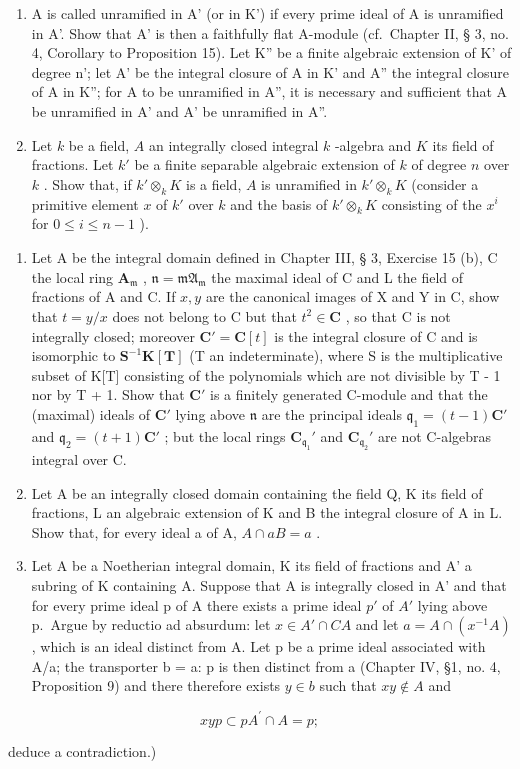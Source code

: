 \begin{enumerate}
\def\labelenumi{(\alph{enumi})}
\setcounter{enumi}{2}
\item
  A is called unramified in A' (or in K') if every prime ideal of A is unramified in A'. Show that A' is then a faithfully flat A-module (cf.~Chapter II, § 3, no. 4, Corollary to Proposition 15). Let K'' be a finite algebraic extension of K' of degree n'; let A' be the integral closure of A in K' and A'' the integral closure of A in K''; for A to be unramified in A'', it is necessary and sufficient that A be unramified in A' and A' be unramified in A''.
\item
  Let \(k\) be a field, \(A\) an integrally closed integral \(k\) -algebra and \(K\) its field of fractions. Let \(k'\) be a finite separable algebraic extension of \(k\) of degree \(n\) over \(k\) . Show that, if \(k' \otimes_k K\) is a field, \(A\) is unramified in \(k' \otimes_k K\) (consider a primitive element \(x\) of \(k'\) over \(k\) and the basis of \(k' \otimes_k K\) consisting of the \(x^i\) for \(0 \leqslant i \leqslant n - 1\) ).
\end{enumerate}

\begin{enumerate}
\def\labelenumi{\arabic{enumi}.}
\setcounter{enumi}{19}
\item
  Let A be the integral domain defined in Chapter III, § 3, Exercise 15 (b), C the local ring \(\mathbf{A}_{\mathfrak{m}}\) , \(\mathfrak{n} = \mathfrak{mA}_{\mathfrak{m}}\) the maximal ideal of C and L the field of fractions of A and C. If \(x, y\) are the canonical images of X and Y in C, show that \(t = y / x\) does not belong to C but that \(t^2 \in \mathbf{C}\) , so that C is not integrally closed; moreover \(\mathbf{C}' = \mathbf{C}[t]\) is the integral closure of C and is isomorphic to \(\mathbf{S}^{-1}\mathbf{K}[\mathbf{T}]\) (T an indeterminate), where S is the multiplicative subset of K{[}T{]} consisting of the polynomials which are not divisible by T - 1 nor by T + 1. Show that \(\mathbf{C}'\) is a finitely generated C-module and that the (maximal) ideals of \(\mathbf{C}'\) lying above \(\mathfrak{n}\) are the principal ideals \(\mathfrak{q}_1 = (t - 1)\mathbf{C}'\) and \(\mathfrak{q}_2 = (t + 1)\mathbf{C}'\) ; but the local rings \(\mathbf{C}_{\mathfrak{q}_1}'\) and \(\mathbf{C}_{\mathfrak{q}_2}'\) are not C-algebras integral over C.
\item
  Let A be an integrally closed domain containing the field Q, K its field of fractions, L an algebraic extension of K and B the integral closure of A in L. Show that, for every ideal a of A, \(A \cap aB = a\) .
\item
  Let A be a Noetherian integral domain, K its field of fractions and A' a subring of K containing A. Suppose that A is integrally closed in A' and that for every prime ideal p of A there exists a prime ideal \(p'\) of \(A'\) lying above p.~Argue by reductio ad absurdum: let \(x \in A' \cap C A\) and let \(a = A \cap (x^{-1} A)\) , which is an ideal distinct from A. Let p be a prime ideal associated with A/a; the transporter b = a: p is then distinct from a (Chapter IV, §1, no. 4, Proposition 9) and there therefore exists \(y \in b\) such that \(xy \notin A\) and
\end{enumerate}

\[
x y p \subset p A ^ {\prime} \cap A = p;
\]

deduce a contradiction.)

